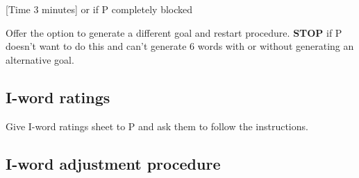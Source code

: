[\textcolor[rgb]{0.0,0.5019608,0.0}{Time 3 minutes}] or if P completely blocked

Offer the option to generate a different goal and restart
procedure. \textbf{STOP} if P doesn't want to do this and can't generate
6 words with or without generating an alternative goal.

\subsection{I-word ratings}

{Give I-word ratings sheet to P and ask them to follow the instructions.}

\subsection{I-word adjustment procedure}

